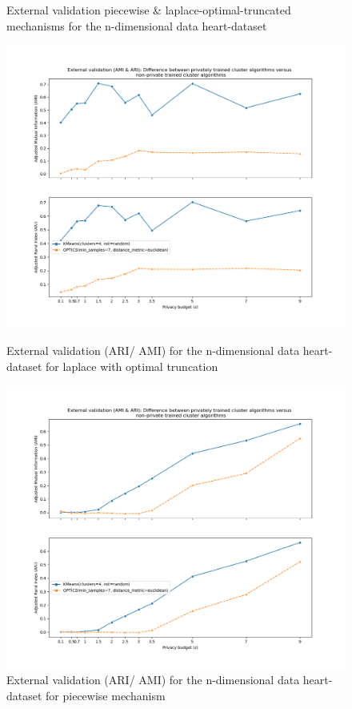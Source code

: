 \begin{figure}[H]
    \caption{External validation piecewise \& laplace-optimal-truncated mechanisms for the n-dimensional data heart-dataset}
    \centering
    \begin{minipage}[c]{0.49\textwidth}
        \includegraphics[width=1\textwidth]{Results/nd-laplace-optimal-truncated/heart-dataset/ami-and-ari.png}
        \caption{External validation (ARI/ AMI) for the n-dimensional data heart-dataset for laplace with optimal truncation}
        \label{fig:external-validation-heart-dataset_comparison_nd-laplace}
    \end{minipage}
    \begin{minipage}[c]{0.49\textwidth}
        \includegraphics[width=1\textwidth]{Results/nd-piecewise/heart-dataset/ami-and-ari.png}
        \caption{External validation (ARI/ AMI) for the n-dimensional data heart-dataset for piecewise mechanism}
        \label{fig:external-validation-heart-dataset_comparison_nd-piecewise}
    \end{minipage}
\end{figure}
\newpage
